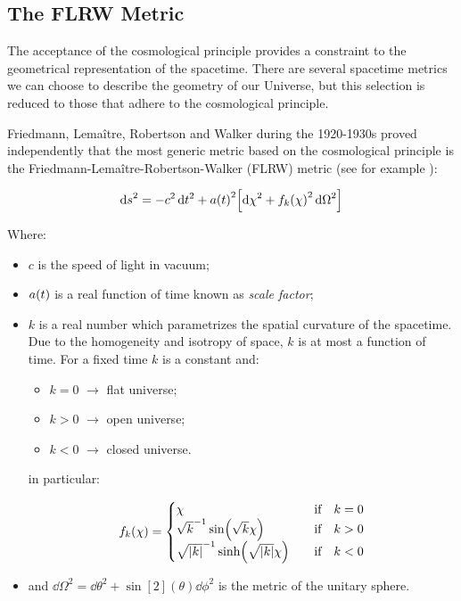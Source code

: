 \subsection{The FLRW Metric}\label{ss:flrw}

The acceptance of the cosmological principle provides a constraint to the
geometrical representation of the spacetime. There are several spacetime
metrics we can choose to describe the geometry of our Universe, but this
selection is reduced to those that adhere to the cosmological principle.

Friedmann, Lema\^itre, Robertson and Walker during the 1920-1930s proved
independently that the most generic metric based on the cosmological
principle is the Friedmann-Lema\^itre-Robertson-Walker (FLRW) metric
(see for example \cite{dodelson2003modern}):

\begin{equation}
        \dd{s}^2 = -c^2\dd{t^2} + a\qty(t)^2\qty[\dd{\chi}^2 +
        f_k\qty(\chi)^2\dd{\Omega}^2]
        \label{eq:flrw}
\end{equation}

Where:

\begin{itemize}
        \item $c$ is the speed of light in vacuum;
        \item $a\qty(t)$ is a real function of time known as \emph{scale factor};
        \item $k$ is a real number which parametrizes the spatial curvature of the
        spacetime. Due to the homogeneity and isotropy of space, $k$ is at most a
        function of time. For a fixed time $k$ is a constant and:

        \begin{itemize}
                \item $k = 0$ $\rightarrow$ flat universe;
                \item $k > 0$ $\rightarrow$ open universe;
                \item $k < 0$ $\rightarrow$ closed universe.
        \end{itemize}

        in particular:

        \begin{equation}
                f_k\qty(\chi) =
                        \begin{cases}
                                 \chi & \qif k = 0 \\
                                 \sqrt{k}^{-1} \sin(\sqrt{k} \chi) & \qif k > 0 \\
                                 \sqrt{\abs{k}}^{-1} \sinh(\sqrt{\abs{k}} \chi) & \qif k < 0
                        \end{cases}
        \end{equation}
        \item and $\dd{\Omega}^2 = \dd{\theta}^2 + \sin[2](\theta) \dd{\phi}^2$
        is the metric of the unitary sphere.
\end{itemize}


